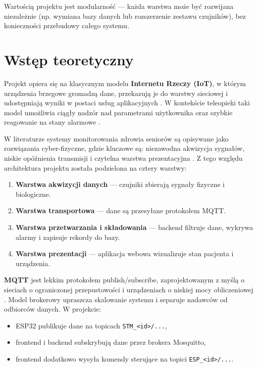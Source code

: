 \documentclass[a4paper,12pt]{article}
\begin{document}
Wartością projektu jest modularność --- każda warstwa może być rozwijana niezależnie (np. wymiana bazy danych lub rozszerzenie zestawu czujników), bez konieczności przebudowy całego systemu.

\section{Wstęp teoretyczny}
Projekt opiera się na klasycznym modelu \textbf{Internetu Rzeczy (IoT)}, w którym urządzenia brzegowe gromadzą dane, przekazują je do warstwy sieciowej i udostępniają wyniki w postaci usług aplikacyjnych \cite{atzori2010iot}. W kontekście teleopieki taki model umożliwia ciągły nadzór nad parametrami użytkownika oraz szybkie reagowanie na stany alarmowe \cite{who2022ageing}.

W literaturze systemy monitorowania zdrowia seniorów są opisywane jako rozwiązania cyber-fizyczne, gdzie kluczowe są: niezawodna akwizycja sygnałów, niskie opóźnienia transmisji i czytelna warstwa prezentacyjna \cite{islam2015healthcare}. Z tego względu architektura projektu została podzielona na cztery warstwy:
\begin{enumerate}
  \item \textbf{Warstwa akwizycji danych} --- czujniki zbierają sygnały fizyczne i biologiczne.
  \item \textbf{Warstwa transportowa} --- dane są przesyłane protokołem MQTT.
  \item \textbf{Warstwa przetwarzania i składowania} --- backend filtruje dane, wykrywa alarmy i zapisuje rekordy do bazy.
  \item \textbf{Warstwa prezentacji} --- aplikacja webowa wizualizuje stan pacjenta i urządzenia.
\end{enumerate}

\textbf{MQTT} jest lekkim protokołem publish/subscribe, zaprojektowanym z myślą o sieciach o ograniczonej przepustowości i urządzeniach o niskiej mocy obliczeniowej \cite{mqtt311spec}. Model brokerowy upraszcza skalowanie systemu i separuje nadawców od odbiorców danych. W projekcie:
\begin{itemize}
  \item ESP32 publikuje dane na topicach \texttt{STM\_<id>/...},
  \item frontend i backend subskrybują dane przez brokera Mosquitto,
  \item frontend dodatkowo wysyła komendy sterujące na topici \texttt{ESP\_<id>/...}.
\end{itemize}
\end{document}
